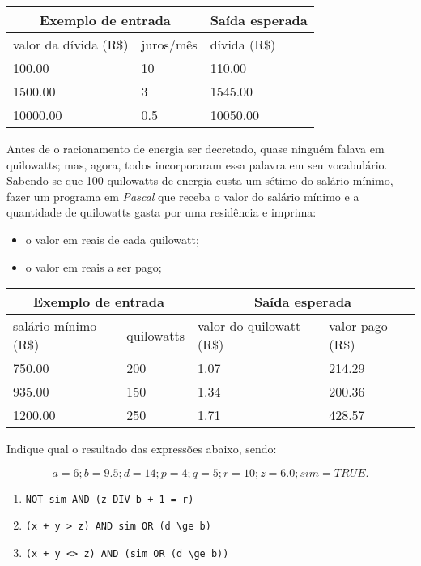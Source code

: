 \begin{center}
\begin{tabular}{|l|l|l|} \hline
\multicolumn{2}{|c|}{Exemplo de entrada} & Saída esperada \\ \hline
valor da dívida (R\$) & juros/mês & dívida (R\$) \\ \hline
100.00 & 10  & 110.00            \\ \hline
1500.00 & 3 &  1545.00          \\ \hline
10000.00 & 0.5 & 10050.00          \\ \hline
\end{tabular}
\end{center}

\item Antes de o racionamento de energia ser decretado, quase ninguém falava 
em quilowatts; mas, agora, todos incorporaram essa palavra em seu vocabulário. 
Sabendo-se que 100 quilowatts de energia custa um sétimo do salário mínimo, 
fazer um programa em \emph{Pascal} que receba o valor do salário mínimo e a 
quantidade de quilowatts gasta por uma residência e imprima:
\begin{itemize}
\item o valor em reais de cada quilowatt;
\item o valor em reais a ser pago;
\end{itemize}

\begin{center}
\begin{tabular}{|l|l|l|l|} \hline
\multicolumn{2}{|c|}{Exemplo de entrada} & \multicolumn{2}{|c|}{Saída esperada} \\ \hline
salário mínimo (R\$) & quilowatts & valor do quilowatt (R\$) & valor pago (R\$) \\ \hline
750.00 & 200 & 1.07 & 214.29           \\ \hline
935.00 & 150 & 1.34 & 200.36         \\ \hline
1200.00 & 250 & 1.71 & 428.57        \\ \hline
\end{tabular}
\end{center}

\item Indique qual o resultado das expressões abaixo, sendo: 

\[
  a=6; b=9.5; d=14; p=4; q=5; r=10; z=6.0 ; sim= TRUE.
\]

\begin {enumerate}
\item \verb|NOT sim AND (z DIV b + 1 = r)|
\item \verb|(x + y > z) AND sim OR (d \ge b)|
\item \verb|(x + y <> z) AND (sim OR (d \ge b))|
\end {enumerate}

